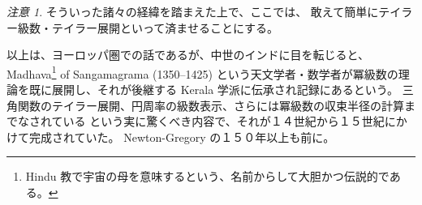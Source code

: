 \documentclass[a4paper]{jsarticle}
\theoremstyle{definition}
\newtheorem{Example}[Theorem]{例}
\theoremstyle{remark}
\newtheorem{Remark}{注意}
\begin{document}
\begin{Remark}
{そういった諸々の経緯を踏まえた上で、ここでは、
敢えて簡単にテイラー級数・テイラー展開といって済ませることにする。

以上は、ヨーロッパ圏での話であるが、中世のインドに目を転じると、
Madhava\footnote{Hindu 教で宇宙の母を意味するという、名前からして大胆かつ伝説的である。} 
of Sangamagrama (1350--1425) 
という天文学者・数学者が冪級数の理論を既に展開し、それが後継する
Kerala 学派に伝承され記録にあるという。
三角関数のテイラー展開、円周率の級数表示、さらには冪級数の収束半径の計算までなされている
という実に驚くべき内容で、それが１４世紀から１５世紀にかけて完成されていた。
Newton-Gregory の１５０年以上も前に。

}
\end{Remark}






\end{document}
